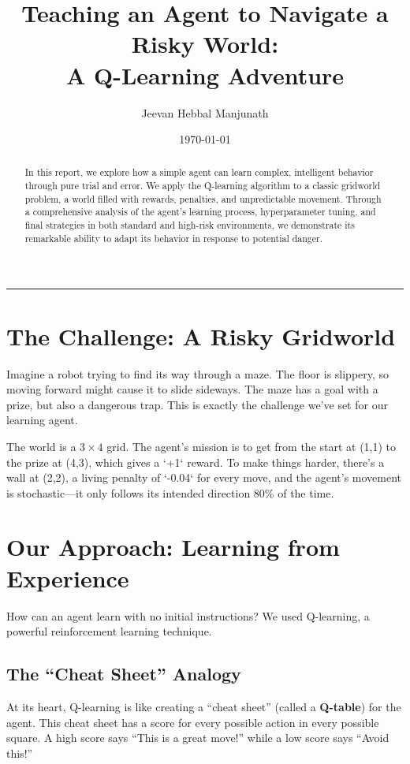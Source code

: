 \documentclass[11pt, a4paper]{article}
\title{\textbf{Teaching an Agent to Navigate a Risky World: \\ A Q-Learning Adventure}}
\author{Jeevan Hebbal Manjunath}
\date{\today}
\begin{document}
\maketitle

\begin{abstract}
In this report, we explore how a simple agent can learn complex, intelligent behavior through pure trial and error. We apply the Q-learning algorithm to a classic gridworld problem, a world filled with rewards, penalties, and unpredictable movement. Through a comprehensive analysis of the agent's learning process, hyperparameter tuning, and final strategies in both standard and high-risk environments, we demonstrate its remarkable ability to adapt its behavior in response to potential danger.
\end{abstract}

\hrule
\vspace{1em}

\section{The Challenge: A Risky Gridworld}
Imagine a robot trying to find its way through a maze. The floor is slippery, so moving forward might cause it to slide sideways. The maze has a goal with a prize, but also a dangerous trap. This is exactly the challenge we've set for our learning agent.

The world is a $3 \times 4$ grid. The agent's mission is to get from the start at (1,1) to the prize at (4,3), which gives a `+1` reward. To make things harder, there's a wall at (2,2), a living penalty of `-0.04` for every move, and the agent's movement is stochastic—it only follows its intended direction 80\% of the time.

\section{Our Approach: Learning from Experience}
How can an agent learn with no initial instructions? We used Q-learning, a powerful reinforcement learning technique.

\subsection{The ``Cheat Sheet'' Analogy}
At its heart, Q-learning is like creating a ``cheat sheet'' (called a \textbf{Q-table}) for the agent. This cheat sheet has a score for every possible action in every possible square. A high score says ``This is a great move!'' while a low score says ``Avoid this!''
\end{document}
